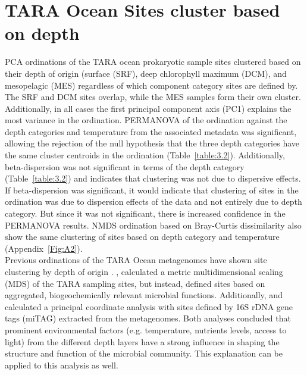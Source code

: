 \section{TARA Ocean Sites cluster based on depth}

PCA ordinations of the TARA ocean prokaryotic sample sites clustered based on their depth of origin (surface (SRF), deep chlorophyll maximum (DCM), and mesopelagic (MES) regardless of which component category sites are defined by. The SRF and DCM sites overlap, while the MES samples form their own cluster. Additionally, in all cases the first principal component axis (PC1) explains the most variance in the ordination. PERMANOVA of the ordination against the depth categories and temperature from the associated metadata was significant, allowing the rejection of the null hypothesis that the three depth categories have the same cluster centroids in the ordination (Table~\ref{table:3.2}). Additionally, beta-dispersion was not significant in terms of the depth category (Table~\ref{table:3.2}) and indicates that clustering was not due to dispersive effects. If beta-dispersion was significant, it would indicate that clustering of sites in the ordination was due to dispersion effects of the data and not entirely due to depth category. But since it was not significant, there is increased confidence in the PERMANOVA results. NMDS ordination based on Bray-Curtis dissimilarity also show the same clustering of sites based on depth category and temperature (Appendix~\ref{Fig:A2}). \\

Previous ordinations of the TARA Ocean metagenomes have shown site clustering by depth of origin \citep{Sunagawa_2015, Louca_2016}. \cite{Louca_2016}, calculated a metric multidimensional scaling (MDS) of the TARA sampling sites, but instead, defined sites based on aggregated, biogeochemically relevant microbial functions. Additionally, \cite{Sunagawa_2015} and \cite{Louca_2016} calculated a principal coordinate analysis with sites defined by 16S rDNA gene tags (miTAG) extracted from the metagenomes. Both analyses concluded that prominent environmental factors (e.g. temperature, nutrients levels, access to light) from the different depth layers have a strong influence in shaping the structure and function of the microbial community. This explanation can be applied to this analysis as well.\\

